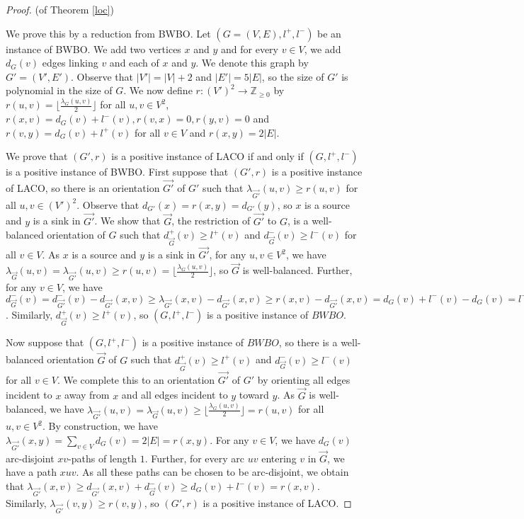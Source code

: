 \documentclass[a4paper,12pt,makeidx]{article}
\begin{document}
\begin{proof}(of Theorem \ref{loc})

We prove this by a reduction from BWBO. Let $(G=(V,E),l^+,l^-)$ be an instance of BWBO. We add two vertices $x$ and $y$ and for every $v \in V$, we add $d_G(v)$ edges linking $v$ and each of $x$ and $y$. We denote this graph by $G'=(V',E')$. Observe that $|V'|=|V|+2$ and $|E'|=5|E|$, so the size of $G'$ is polynomial in the size of $G$. We now define $r:(V')^2 \rightarrow \mathbb{Z}_{\geq 0}$ by $r(u,v)=\lfloor\frac{\lambda_G(u,v)}{2}\rfloor$ for all $u,v \in V^2$, $r(x,v)=d_G(v)+l^-(v),r(v,x)=0,r(y,v)=0$ and $r(v,y)=d_G(v)+l^+(v)$ for all $v \in V$ and $r(x,y)=2|E|$.

We prove that $(G',r)$ is a positive instance of LACO if and only if $(G,l^+,l^-)$ is a positive instance of BWBO. First suppose that $(G',r)$ is a positive instance of LACO, so there is an orientation $\vec{G'}$ of $G'$ such that $\lambda_{\vec{G'}}(u,v)\geq r(u,v)$ for all $u,v \in (V')^2$. Observe that $d_{G'}(x)=r(x,y)=d_{G'}(y)$, so $x$ is a source and $y$ is a sink in $\vec{G'}$. We show that $\vec{G}$, the restriction of $\vec{G'}$ to $G$, is a well-balanced orientation of $G$ such that $d_{\vec{G}}^+(v)\geq l^+(v)$ and $d_{\vec{G}}^-(v)\geq l^-(v)$ for all $v \in V$. As $x$ is a source and $y$ is a sink in $\vec{G'}$, for any $u,v \in V^2$, we have $\lambda_{\vec{G}}(u,v)=\lambda_{\vec{G'}}(u,v)\geq r(u,v)=\lfloor\frac{\lambda_G(u,v)}{2}\rfloor$, so $\vec{G}$ is well-balanced. Further, for any $v \in V$, we have $d_{\vec{G}}^-(v)=d_{\vec{G'}}^-(v)-d_{\vec{G'}}(x,v)\geq \lambda_{\vec{G'}}(x,v)-d_{\vec{G'}}(x,v)\geq r(x,v)-d_{\vec{G'}}(x,v)=d_G(v)+l^-(v)-d_G(v)=l^-(v)$. Similarly, $d_{\vec{G}}^+(v)\geq l^+(v)$, so $(G,l^+,l^-)$ is a positive instance of $BWBO$.

Now suppose that  $(G,l^+,l^-)$ is a positive instance of $BWBO$, so there is a well-balanced orientation $\vec{G}$ of $G$ such that $d_{\vec{G}}^+(v)\geq l^+(v)$ and $d_{\vec{G}}^-(v)\geq l^-(v)$ for all $v \in V$. We complete this to an orientation $\vec{G'}$ of $G'$ by orienting all edges incident to $x$ away from $x$ and  all edges incident to $y$ toward $y$. As $\vec{G}$ is well-balanced, we have $\lambda_{\vec{G'}}(u,v)=\lambda_{\vec{G}}(u,v)\geq \lfloor\frac{\lambda_G(u,v)}{2}\rfloor=r(u,v)$ for all $u,v \in V^2$. By construction, we have $\lambda_{\vec{G'}}(x,y)=\sum_{v \in V}d_G(v)=2|E|=r(x,y)$. For any $v \in V$, we have $d_G(v)$ arc-disjoint $xv$-paths of length $1$. Further, for every arc $uv$ entering $v$ in $\vec{G}$, we have a path $xuv$. As all these paths can be chosen to be arc-disjoint, we obtain that $\lambda_{\vec{G'}}(x,v)\geq d_{\vec{G'}}(x,v)+d^-_{\vec{G}}(v)\geq d_G(v)+l^-(v)=r(x,v)$. Similarly, $\lambda_{\vec{G'}}(v,y)\geq r(v,y)$, so $(G',r)$ is a positive instance of LACO.
\end{proof}
\end{document}
